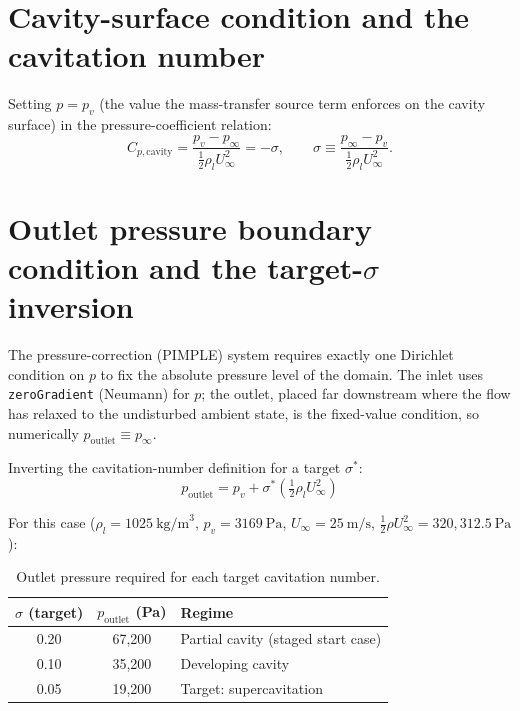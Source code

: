 \section{Cavity-surface condition and the cavitation number}

Setting $p = p_v$ (the value the mass-transfer source term enforces on the
cavity surface) in the pressure-coefficient relation:
\begin{equation}
    C_{p,\text{cavity}} = \frac{p_v - p_\infty}{\tfrac12 \rho_l U_\infty^2} = -\sigma,
    \qquad
    \sigma \equiv \frac{p_\infty - p_v}{\tfrac12 \rho_l U_\infty^2}.
\end{equation}

\section{Outlet pressure boundary condition and the target-$\sigma$ inversion}

The pressure-correction (PIMPLE) system requires exactly one Dirichlet
condition on $p$ to fix the absolute pressure level of the domain. The inlet
uses \texttt{zeroGradient} (Neumann) for $p$; the outlet, placed far downstream
where the flow has relaxed to the undisturbed ambient state, is the fixed-value
condition, so numerically $p_{\text{outlet}} \equiv p_\infty$.

Inverting the cavitation-number definition for a target $\sigma^*$:
\begin{equation}
    \boxed{p_{\text{outlet}} = p_v + \sigma^* \left(\tfrac12 \rho_l U_\infty^2\right)}
\end{equation}

For this case ($\rho_l = 1025\ \text{kg/m}^3$, $p_v = 3169\ \text{Pa}$,
$U_\infty = 25\ \text{m/s}$, $\tfrac12\rho U_\infty^2 = 320{,}312.5\ \text{Pa}$):

\begin{table}[h]
\centering
\begin{tabular}{ccl}
\toprule
$\sigma$ (target) & $p_{\text{outlet}}$ (Pa) & Regime \\
\midrule
0.20 & 67{,}200 & Partial cavity (staged start case) \\
0.10 & 35{,}200 & Developing cavity \\
0.05 & 19{,}200 & Target: supercavitation \\
\bottomrule
\end{tabular}
\caption{Outlet pressure required for each target cavitation number.}
\end{table}

